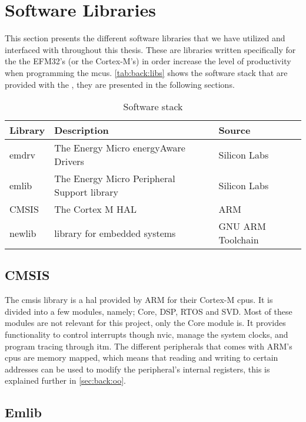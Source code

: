 
\section{Software Libraries}
\label{sec:back:lib}

This section presents the different software libraries that we have utilized and interfaced with throughout this thesis.
These are libraries written specifically for the the EFM32's (or the Cortex-M's) in order increase the level of productivity when programming the \glspl{mcu}.
\autoref{tab:back:libs} shows the software stack that are provided with the {\gecko}, they are presented in the following sections.

\begin{table}[H]
  \begin{tabular}{l|l|l}
    \textbf{Library} & \textbf{Description} & \textbf{Source} \\
    \hline
    emdrv & The Energy Micro energyAware Drivers & Silicon Labs \\
    emlib & The Energy Micro Peripheral Support library & Silicon Labs \\
    CMSIS & The Cortex M HAL & ARM \\
    newlib & {\C} library for embedded systems & GNU ARM Toolchain \\
    \hline
  \end{tabular}
  \caption{Software stack}
  \label{tab:back:libs}
\end{table}

\subsection{CMSIS}
\label{sub:cmsis}

The \gls{cmsis} library is a \gls{hal} provided by ARM for their Cortex-M \glspl{cpu}.
It is divided into a few modules, namely; Core, DSP, RTOS and SVD.
Most of these modules are not relevant for this project, only the Core module is.
It provides functionality to control interrupts though \gls{nvic}, manage the system clocks, and program tracing through \gls{itm}.
The different peripherals that comes with ARM's \glspl{cpu} are memory mapped, which means that reading and writing to certain addresses can be used to modify the peripheral's internal registers, this is explained further in \autoref{sec:back:oo}.

\subsection{Emlib}
\label{sub:emlib}

